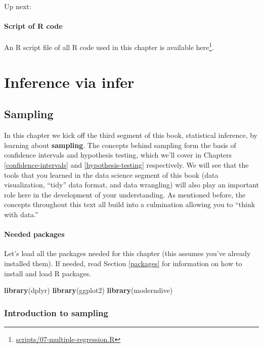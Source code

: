 \documentclass[12pt,]{krantz}
\makeatletter
\newenvironment{Shaded}{\begin{snugshade}}{\end{snugshade}}
\newcommand{\KeywordTok}[1]{\textcolor[rgb]{0.27,0.27,0.27}{\textbf{#1}}}
\newcommand{\NormalTok}[1]{#1}
\renewcommand{\href}[2]{#2\footnote{\url{#1}}}
\newenvironment{kframe}{%
\medskip{}
\setlength{\fboxsep}{.8em}
 \def\at@end@of@kframe{}%
 \ifinner\ifhmode%
  \def\at@end@of@kframe{\end{minipage}}%
  \begin{minipage}{\columnwidth}%
 \fi\fi%
 \def\FrameCommand##1{\hskip\@totalleftmargin \hskip-\fboxsep
 \colorbox{shadecolor}{##1}\hskip-\fboxsep
     \hskip-\linewidth \hskip-\@totalleftmargin \hskip\columnwidth}%
 \MakeFramed {\advance\hsize-\width
   \@totalleftmargin\z@ \linewidth\hsize
   \@setminipage}}%
 {\par\unskip\endMakeFramed%
 \at@end@of@kframe}
\renewenvironment{Shaded}{\begin{kframe}}{\end{kframe}}
\theoremstyle{definition}
\theoremstyle{definition}
\theoremstyle{definition}
\theoremstyle{remark}
\makeatother
\begin{document}
Up next:

\subsection{Script of R code}\label{script-of-r-code-4}

An R script file of all R code used in this chapter is available
\href{scripts/07-multiple-regression.R}{here}.

\part{Inference via infer}\label{part-inference-via-infer}

\chapter{Sampling}\label{sampling}

In this chapter we kick off the third segment of this book, statistical
inference, by learning about \textbf{sampling}. The concepts behind
sampling form the basis of confidence intervals and hypothesis testing,
which we'll cover in Chapters \ref{confidence-intervals} and
\ref{hypothesis-testing} respectively. We will see that the tools that
you learned in the data science segment of this book (data
visualization, ``tidy'' data format, and data wrangling) will also play
an important role here in the development of your understanding. As
mentioned before, the concepts throughout this text all build into a
culmination allowing you to ``think with data.''

\subsection*{Needed packages}\label{needed-packages-5}


Let's load all the packages needed for this chapter (this assumes you've
already installed them). If needed, read Section \ref{packages} for
information on how to install and load R packages.

\begin{Shaded}
\begin{Highlighting}[]
\KeywordTok{library}\NormalTok{(dplyr)}
\KeywordTok{library}\NormalTok{(ggplot2)}
\KeywordTok{library}\NormalTok{(moderndive)}
\end{Highlighting}
\end{Shaded}

\section{Introduction to sampling}\label{introduction-to-sampling}
\end{document}
